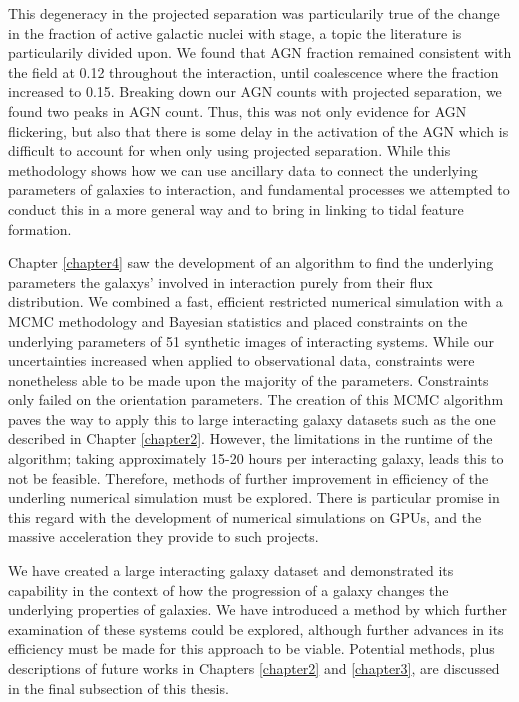 This degeneracy in the projected separation was particularily true of the change in the fraction of active galactic nuclei with stage, a topic the literature is particularily divided upon. We found that AGN fraction remained consistent with the field at 0.12 throughout the interaction, until coalescence where the fraction increased to 0.15. Breaking down our AGN counts with projected separation, we found two peaks in AGN count. Thus, this was not only evidence for AGN flickering, but also that there is some delay in the activation of the AGN which is difficult to account for when only using projected separation. While this methodology shows how we can use ancillary data to connect the underlying parameters of galaxies to interaction, and fundamental processes we attempted to conduct this in a more general way and to bring in linking to tidal feature formation. 

Chapter \ref{chapter4} saw the development of an algorithm to find the underlying parameters the galaxys' involved in interaction purely from their flux distribution. We combined a fast, efficient restricted numerical simulation with a MCMC methodology and Bayesian statistics and placed constraints on the underlying parameters of 51 synthetic images of interacting systems. While our uncertainties increased when applied to observational data, constraints were nonetheless able to be made upon the majority of the parameters. Constraints only failed on the orientation parameters. The creation of this MCMC algorithm paves the way to apply this to large interacting galaxy datasets such as the one described in Chapter \ref{chapter2}. However, the limitations in the runtime of the algorithm; taking approximately 15-20 hours per interacting galaxy, leads this to not be feasible. Therefore, methods of further improvement in efficiency of the underling numerical simulation must be explored. There is particular promise in this regard with the development of numerical simulations on GPUs, and the massive acceleration they provide to such projects.

We have created a large interacting galaxy dataset and demonstrated its capability in the context of how the progression of a galaxy changes the underlying properties of galaxies. We have introduced a method by which further examination of these systems could be explored, although further advances in its efficiency must be made for this approach to be viable. Potential methods, plus descriptions of future works in Chapters \ref{chapter2} and \ref{chapter3}, are discussed in the final subsection of this thesis.

